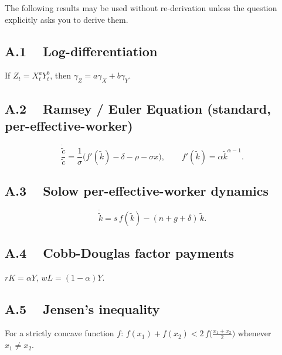 \documentclass[a4paper,11pt]{article}
\newcommand{\ktilde}{\tilde{k}}
\newcommand{\ctilde}{\tilde{c}}
\begin{document}
The following results may be used without re-derivation unless the question explicitly asks
you to derive them.

\subsection*{A.1 ~ Log-differentiation}
If $Z_t = X_t^a Y_t^b$, then $\gamma_Z = a\gamma_X + b\gamma_Y$.

\subsection*{A.2 ~ Ramsey / Euler Equation (standard, per-effective-worker)}
\[
    \frac{\dot{\ctilde}}{\ctilde}
    = \frac{1}{\sigma}\bigl(f'(\ktilde) - \delta - \rho - \sigma x\bigr),
    \qquad
    f'(\ktilde) = \alpha\ktilde^{\alpha-1}.
\]

\subsection*{A.3 ~ Solow per-effective-worker dynamics}
\[
    \dot{\ktilde} = s\,f(\ktilde) - (n+g+\delta)\,\ktilde.
\]

\subsection*{A.4 ~ Cobb-Douglas factor payments}
$rK = \alpha Y$, \quad $wL = (1-\alpha)Y$.

\subsection*{A.5 ~ Jensen's inequality}
For a strictly concave function $f$: \;
$f(x_1) + f(x_2) < 2\,f\!\bigl(\tfrac{x_1+x_2}{2}\bigr)$
whenever $x_1 \neq x_2$.
\end{document}
